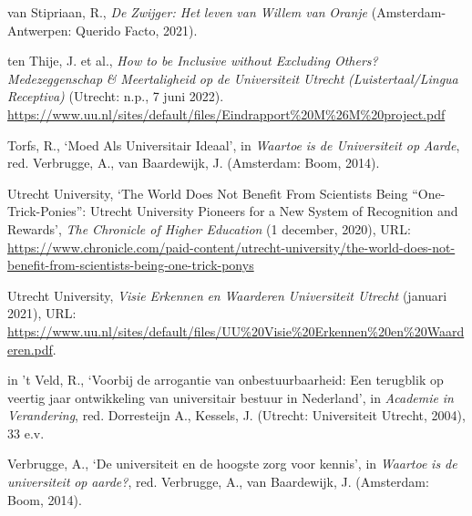 \documentclass[smallauthor, chapterhaspagenum, nochapterinheader, pagenuminheader,  bigchapnum,medium2, tocpages, garamond, titleinheader]{jote-book}
\begin{document}
\begin{references}
		van Stipriaan, R., \emph{De }\emph{Zwijger}\emph{: Het }\emph{leven}\emph{ van Willem van }\emph{Oranje}\emph{ }(Amsterdam-Antwerpen: Querido Facto, 2021).



		ten Thije, J. et al., \emph{How to be Inclusive without Excluding Others? }\emph{Medezeggenschap}\emph{ \& }\emph{Meertaligheid}\emph{ op de Universiteit Utrecht} \emph{(}\emph{Luistertaal}\emph{/Lingua }\emph{Receptiva}\emph{)} (Utrecht: n.p., 7 juni 2022). \href{https://www.uu.nl/sites/default/files/Eindrapport\%20M\%26M\%20project.pdf}{https://www.uu.nl/sites/default/files/Eindrapport\%20M\%26M\%20project.pdf}



		Torfs, R., ‘Moed Als Universitair Ideaal', in \emph{Waartoe}\emph{ is de Universiteit op }\emph{Aarde}, red. Verbrugge, A., van Baardewijk, J. (Amsterdam: Boom, 2014).



		Utrecht University, ‘The World Does Not Benefit From Scientists Being “One-Trick-Ponies”: Utrecht University Pioneers for a New System of Recognition and Rewards', \emph{The Chronicle of Higher Education} (1 december, 2020), URL: \href{https://www.chronicle.com/paid-content/utrecht-university/the-world-does-not-benefit-from-scientists-being-one-trick-ponys}{https://www.chronicle.com/paid-content/utrecht-university/the-world-does-not-benefit-from-scientists-being-one-trick-ponys}



		Utrecht University, \emph{Visie}\emph{ }\emph{Erkennen}\emph{ }\emph{en}\emph{ }\emph{Waarderen}\emph{ Universiteit Utrecht} (januari 2021), URL: \href{https://www.uu.nl/sites/default/files/UU\%20Visie\%20Erkennen\%20en\%20Waarderen.pdf}{https://www.uu.nl/sites/default/files/UU\%20Visie\%20Erkennen\%20en\%20Waarderen.pdf}.



		in 't Veld, R., ‘Voorbij de arrogantie van onbestuurbaarheid: Een terugblik op veertig jaar ontwikkeling van universitair bestuur in Nederland', in \emph{Academie}\emph{ in }\emph{Verandering}, red. Dorresteijn A., Kessels, J. (Utrecht: Universiteit Utrecht, 2004), 33 e.v.



		Verbrugge, A., ‘De universiteit en de hoogste zorg voor kennis', in \emph{Waartoe}\emph{ is de }\emph{universiteit}\emph{ op }\emph{aarde}\emph{?}, red. Verbrugge, A., van Baardewijk, J. (Amsterdam: Boom, 2014).




\end{references}
\end{document}
